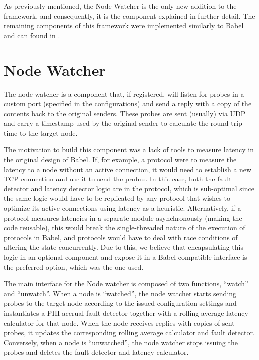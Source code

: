 As previously mentioned, the  Node Watcher is the only new addition to the framework, and consequently, it is the component explained in further detail. The remaining components of this framework were implemented similarly to Babel  and can found in .

\section{Node Watcher}

The node watcher is a component that, if registered, will listen for probes in a custom port (specified in the configurations) and send a reply with a copy of the contents back to the original senders. These probes are sent (usually) via UDP and carry a timestamp used by the original sender to calculate the round-trip time to the target node.

The motivation to build this component was a lack of tools to measure latency in the original design of Babel. If, for example, a protocol were to measure the latency to a node without an active connection, it would need to establish a new TCP connection and use it to send the probes. In this case, both the fault detector and latency detector logic are in the protocol, which is sub-optimal since the same logic would have to be replicated by any protocol that wishes to optimize its active connections using latency as a heuristic. Alternatively, if a protocol measures latencies in a separate module asynchronously (making the code reusable), this would break the single-threaded nature of the execution of protocols in Babel, and protocols would have to deal with race conditions of altering the state concurrently. Due to this, we believe that encapsulating this logic in an optional component and expose it in a Babel-compatible interface is the preferred option, which was the one used.

The main interface for the Node watcher is composed of two functions, ``watch'' and ``unwatch''. When a node is ``watched'', the node watcher starts sending probes to the target node according to the issued configuration settings and instantiates a PHI-accrual fault detector  together with a rolling-average latency calculator for that node. When the node receives replies with copies of sent probes, it updates the corresponding rolling average calculator and fault detector. Conversely, when a node is ``unwatched'', the node watcher stops issuing the probes and deletes the fault detector and latency calculator.


